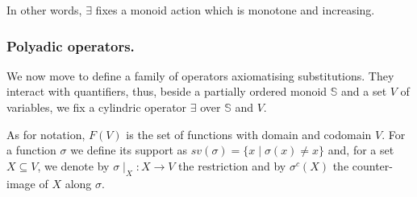 \documentclass{llncs}
\def\monid{{\mathbf 0}}
\def\monid{\mathbf{1}}
\begin{document}
In other words, $\exists$ fixes a monoid action which is monotone and increasing.

%
%
%
%


\subsubsection{Polyadic operators.}
We now move to define a family of operators axiomatising substitutions.  
They interact with quantifiers, thus, beside a partially ordered monoid $\mathbb{S}$
and a set $V$ of variables, we fix a cylindric operator $\exists$ over ${\mathbb S}$ and $V$.

As for notation, $F(V)$ is the set of functions with domain and codomain $V$.
For a function $\sigma$ %
we define its support as $sv(\sigma) = \{x \mid \sigma(x) \neq x\}$
and, for a set $X \subseteq V$, we denote by 
$\sigma \mid_{X}: X \rightarrow V$ the restriction and
by $\sigma^{c}(X)$ the counter-image of $X$ along $\sigma$.
\end{document}
